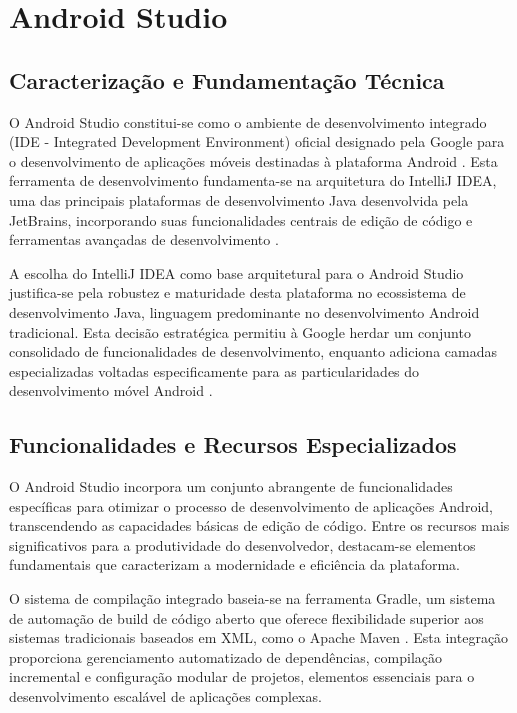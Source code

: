 \section{Android Studio}
\subsection{Caracterização e Fundamentação Técnica}

O Android Studio constitui-se como o ambiente de desenvolvimento integrado (IDE - Integrated Development Environment) oficial designado pela Google para o desenvolvimento de aplicações móveis destinadas à plataforma Android \cite{google2023androidstudio}. Esta ferramenta de desenvolvimento fundamenta-se na arquitetura do IntelliJ IDEA, uma das principais plataformas de desenvolvimento Java desenvolvida pela JetBrains, incorporando suas funcionalidades centrais de edição de código e ferramentas avançadas de desenvolvimento \cite{jetbrains2023intellij}.

A escolha do IntelliJ IDEA como base arquitetural para o Android Studio justifica-se pela robustez e maturidade desta plataforma no ecossistema de desenvolvimento Java, linguagem predominante no desenvolvimento Android tradicional. Esta decisão estratégica permitiu à Google herdar um conjunto consolidado de funcionalidades de desenvolvimento, enquanto adiciona camadas especializadas voltadas especificamente para as particularidades do desenvolvimento móvel Android \cite{meier2023android}.

\subsection{Funcionalidades e Recursos Especializados}

O Android Studio incorpora um conjunto abrangente de funcionalidades específicas para otimizar o processo de desenvolvimento de aplicações Android, transcendendo as capacidades básicas de edição de código. Entre os recursos mais significativos para a produtividade do desenvolvedor, destacam-se elementos fundamentais que caracterizam a modernidade e eficiência da plataforma.

O sistema de compilação integrado baseia-se na ferramenta Gradle, um sistema de automação de build de código aberto que oferece flexibilidade superior aos sistemas tradicionais baseados em XML, como o Apache Maven \cite{gradle2023build}. Esta integração proporciona gerenciamento automatizado de dependências, compilação incremental e configuração modular de projetos, elementos essenciais para o desenvolvimento escalável de aplicações complexas.

